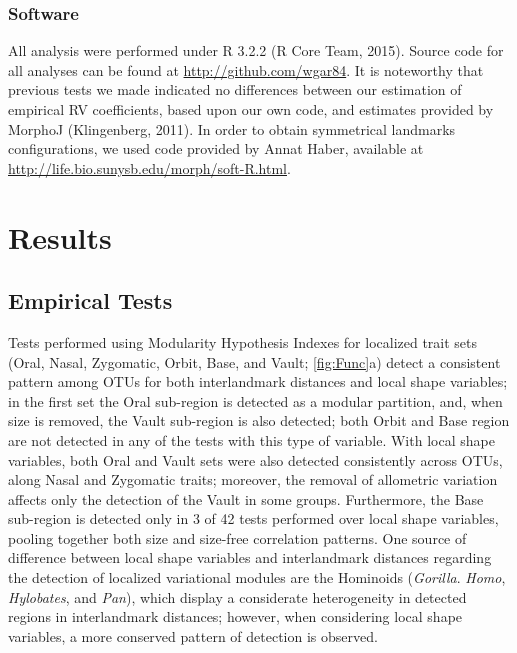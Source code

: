 \documentclass[12pt,twoside]{report}
\begin{document}
\subsubsection{Software}\label{software}

All analysis were performed under R 3.2.2 (R Core Team, 2015). Source
code for all analyses can be found at \url{http://github.com/wgar84}. It
is noteworthy that previous tests we made indicated no differences
between our estimation of empirical RV coefficients, based upon our own
code, and estimates provided by MorphoJ (Klingenberg, 2011). In order to
obtain symmetrical landmarks configurations, we used code provided by
Annat Haber, available at
\url{http://life.bio.sunysb.edu/morph/soft-R.html}.

\section{Results}\label{results}

\subsection{Empirical Tests}\label{empirical-tests}

Tests performed using Modularity Hypothesis Indexes for localized trait
sets (Oral, Nasal, Zygomatic, Orbit, Base, and Vault;
\autoref{fig:Func}a) detect a consistent pattern among OTUs for both
interlandmark distances and local shape variables; in the first set the
Oral sub-region is detected as a modular partition, and, when size is
removed, the Vault sub-region is also detected; both Orbit and Base
region are not detected in any of the tests with this type of variable.
With local shape variables, both Oral and Vault sets were also detected
consistently across OTUs, along Nasal and Zygomatic traits; moreover,
the removal of allometric variation affects only the detection of the
Vault in some groups. Furthermore, the Base sub-region is detected only
in 3 of 42 tests performed over local shape variables, pooling together
both size and size-free correlation patterns. One source of difference
between local shape variables and interlandmark distances regarding the
detection of localized variational modules are the Hominoids
(\emph{Gorilla}. \emph{Homo}, \emph{Hylobates}, and \emph{Pan}), which
display a considerate heterogeneity in detected regions in interlandmark
distances; however, when considering local shape variables, a more
conserved pattern of detection is observed.
\end{document}
